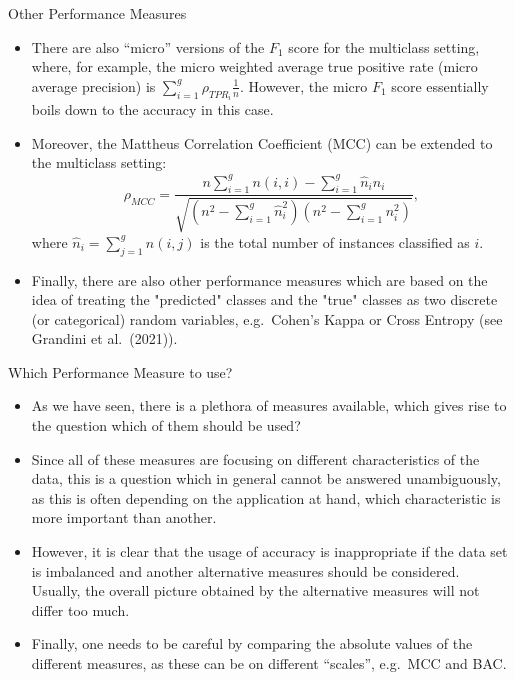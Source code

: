 \begin{vbframe}{Other Performance Measures}
	\footnotesize{
		\begin{itemize}
%			
			\item There are also ``micro'' versions of the $F_1$ score for the multiclass setting, where, for example, the micro weighted average true positive rate (micro average precision) is $\sum_{i=1}^g  \rho_{TPR_i} \frac{1}{n}.$ However, the micro $F_1$ score essentially boils down to the accuracy in this case.
%			
			\item Moreover, the Mattheus Correlation Coefficient (MCC) can be extended to the multiclass setting:
%			
			$$   \rho_{MCC} = \frac{ n  \sum_{i=1}^g n(i,i) -  \sum_{i=1}^g \hat n_i n_i}{\sqrt{ (n^2 - \sum_{i=1}^g \hat n_i^2)(n^2 - \sum_{i=1}^g n_i^2)  }},$$
%			
			where $\hat n_i = \sum_{j=1}^g n(i,j)$ is the total number of instances classified as $i.$
%			
			\item Finally, there are also other performance measures which are based on the idea of treating the "predicted" classes and the "true" classes as two discrete (or categorical) random variables, e.g.\ Cohen's Kappa or Cross Entropy (see Grandini et al.\ (2021)).
%			 
%			
		\end{itemize}
	}
\end{vbframe}


\begin{vbframe}{Which Performance Measure to use?}
	\small{
		\begin{itemize}
			\item As we have seen, there is a plethora of measures available, which gives rise to the question which of them should be used?	
			\item  Since all of these measures are focusing on different characteristics of the data, this is a question which in general cannot be answered unambiguously, as this is often depending on the application at hand, which characteristic is more important than another.
			\item However, it is clear that the usage of accuracy is inappropriate if the data set is imbalanced and another alternative measures should be considered. Usually, the overall picture obtained by the alternative measures will not differ too much.
			\item Finally, one needs to be careful by comparing the absolute values of the different measures, as these can be on different ``scales'', e.g.\ MCC and BAC. 
		\end{itemize}
	}
\end{vbframe}



%
\endlecture

